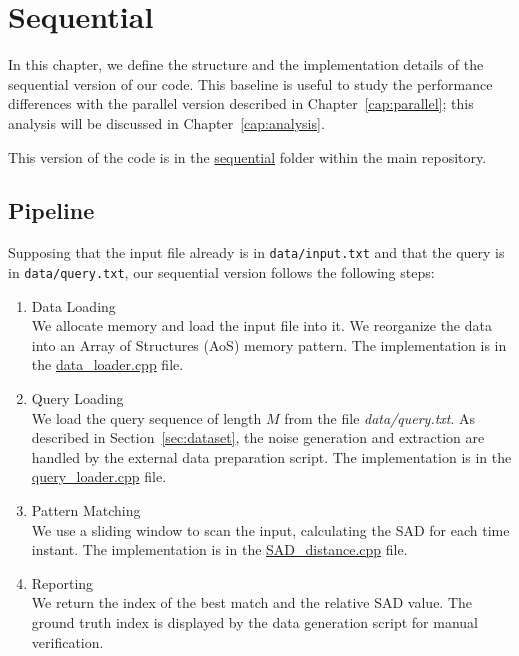 \chapter{Sequential}
\label{cap:sequential}
In this chapter, we define the structure and the implementation details of the sequential version of our code. This baseline is useful to study the performance differences with the parallel version described in Chapter~\ref{cap:parallel}; this analysis will be discussed in Chapter~\ref{cap:analysis}.

This version of the code is in the \href{https://github.com/edoardosarri24/time-series-pattern-recognition/blob/730e3003e125bb1180bfccfef96649d08320eafd/sequential}{sequential} folder within the main repository.

\section{Pipeline}
Supposing that the input file already is in \texttt{data/input.txt} and that the query is in \texttt{data/query.txt}, our sequential version follows the following steps:
\begin{enumerate}
    \item Data Loading \\
        We allocate memory and load the input file into it. We reorganize the data into an Array of Structures (AoS) memory pattern. The implementation is in the \href{https://github.com/edoardosarri24/time-series-pattern-recognition/blob/253e653c7d69c6c0e1f57485dc770105cea637ee/sequential/src/data_loader.cpp}{data\_loader.cpp} file.
    \item Query Loading \\
        We load the query sequence of length $M$ from the file \textit{data/query.txt}. As described in Section~\ref{sec:dataset}, the noise generation and extraction are handled by the external data preparation script. The implementation is in the \href{https://github.com/edoardosarri24/time-series-pattern-recognition/blob/a9dfa266d9fea1eae1e7256da641cce54909b2f5/sequential/src/query_loader.cpp}{query\_loader.cpp} file.
    \item Pattern Matching \\
        We use a sliding window to scan the input, calculating the SAD for each time instant. The implementation is in the \href{https://github.com/edoardosarri24/time-series-pattern-recognition/blob/730e3003e125bb1180bfccfef96649d08320eafd/sequential/src/SAD_distance.cpp}{SAD\_distance.cpp} file.
    \item Reporting \\
        We return the index of the best match and the relative SAD value. The ground truth index is displayed by the data generation script for manual verification.
\end{enumerate}

